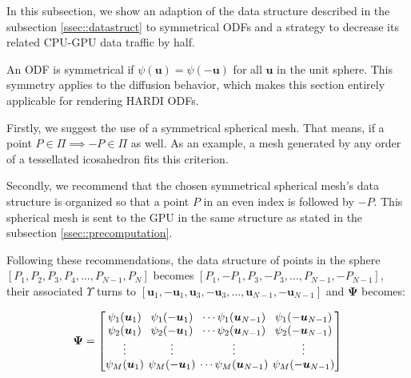 \documentclass[twoside,twocolumn,10pt]{article}
\begin{document}
In this subsection, we show an adaption of the data structure described in the subsection \ref{ssec::datastruct} to symmetrical ODFs and a strategy to decrease its related CPU-GPU data traffic by half.

An ODF is symmetrical if $\psi(\bm{u}) = \psi(-\bm{u})$ for all $\bm{u}$ in the unit sphere. This symmetry applies to the diffusion behavior, which makes this section entirely applicable for rendering HARDI ODFs.%

Firstly, we suggest the use of a symmetrical spherical mesh. That means, if a point $P \in \Pi \implies -P \in \Pi$ as well. As an example, a mesh generated by any order of a tessellated icosahedron fits this criterion.

Secondly, we recommend that the chosen symmetrical spherical mesh's data structure is organized so that a point $P$ in an even index is followed by $-P$. This spherical mesh is sent to the GPU in the same structure as stated in the subsection \ref{ssec::precomputation}.


Following these recommendations, the data structure of points in the sphere $[P_1, P_2, P_3, P_4, \dots, P_{N-1}, P_N]$ becomes $[P_1, -P_1, P_3, -P_3, \dots, P_{N-1}, -P_{N-1}]$, their associated $\Upsilon$ turns to $[\bm{u}_1, -\bm{u}_1, \bm{u}_3, -\bm{u}_3, \dots, \bm{u}_{N-1}, -\bm{u}_{N-1}]$ and $\bm{\Psi}$ becomes:

\begin{equation*}
\bm{\Psi} = 
\begingroup %
\setlength\arraycolsep{2pt}
\begin{bmatrix} 
    \psi_1(\bm{u}_1) & \psi_1(-\bm{u}_1) & \cdots \psi_1(\bm{u}_{N-1}) & \psi_1(-\bm{u}_{N-1})  \\
    
     \psi_2(\bm{u}_1)& \psi_2(-\bm{u}_1) & \cdots \psi_2(\bm{u}_{N-1}) & \psi_2(-\bm{u}_{N-1}) \\

    \vdots & \vdots & \vdots & \vdots  \\
    
     \psi_M(\bm{u}_1)&\psi_M(-\bm{u}_1) & \cdots \psi_M(\bm{u}_{N-1}) & \psi_M(-\bm{u}_{N-1})
    
\end{bmatrix}
\endgroup
\end{equation*}
\end{document}
